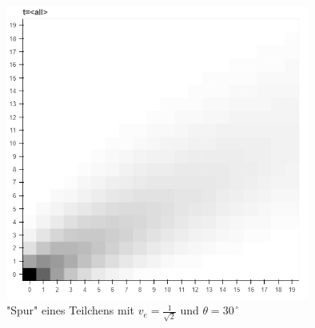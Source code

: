\documentclass[a4paper,12pt,ngerman]{scrartcl}
\theoremstyle{plain}
\theoremstyle{plain}
\theoremstyle{plain}
\theoremstyle{plain}
\begin{document}
\vspace{2cm}
\begin{figure}[h]
\centering
\includegraphics[width=10cm]{movement-trace-30-deg-1-speed.png}
\caption{"Spur" eines Teilchens mit $v_e=\frac{1}{\sqrt{2}}$ und $\theta=30^{\,\circ}$}
\end{figure}
\end{document}
